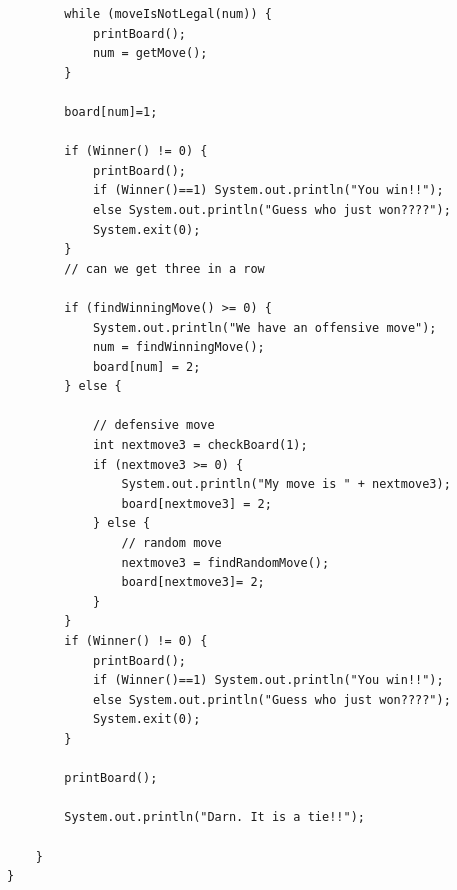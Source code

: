 \begin{lstlisting}
        while (moveIsNotLegal(num)) {
            printBoard();
            num = getMove();
        }
          
        board[num]=1;
  
        if (Winner() != 0) {
            printBoard();
            if (Winner()==1) System.out.println("You win!!");
            else System.out.println("Guess who just won????");
            System.exit(0); 
        }
        // can we get three in a row
  
        if (findWinningMove() >= 0) {
            System.out.println("We have an offensive move");
            num = findWinningMove();
            board[num] = 2;
        } else {
  
            // defensive move
            int nextmove3 = checkBoard(1);
            if (nextmove3 >= 0) {
                System.out.println("My move is " + nextmove3);
                board[nextmove3] = 2;
            } else {
                // random move
                nextmove3 = findRandomMove();
                board[nextmove3]= 2;
            }
        }
        if (Winner() != 0) {
            printBoard();
            if (Winner()==1) System.out.println("You win!!");
            else System.out.println("Guess who just won????");
            System.exit(0); 
        }
      
        printBoard();
          
        System.out.println("Darn. It is a tie!!");
  
    }
}       
         

\end{lstlisting}





\newpage

\nocite{*}






